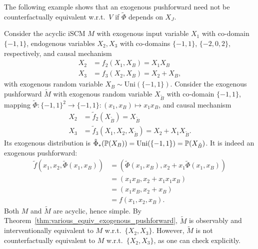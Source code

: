 The following example shows that an exogenous pushforward need not be counterfactually equivalent w.r.t.\ $V$ if $\tilde{\Phi}$ depends on $X_J$.
\begin{Eg}\label{eg:exogenous_pushforward_not_counterfactually_equivalent}
Consider the acyclic iSCM $M$ with exogenous input variable $X_1$ with co-domain $\{-1,1\}$, endogenous variables $X_2,X_3$ with co-domains $\{-1,1\}$, $\{-2,0,2\}$, respectively, and causal mechanism
  $$\begin{aligned} 
    X_2 &= f_2(X_1,X_B) = X_1 X_B \\
    X_3 &= f_3(X_2,X_B) = X_2 + X_B,
  \end{aligned}$$
with exogenous random variable $X_B \sim \mathrm{Uni}(\{-1,1\})$.
  Consider the exogenous pushforward $\tilde{M}$ with exogenous random variable $X_{\tilde{B}}$ with co-domain $\{-1,1\}$, mapping $\tilde{\Phi} : \{-1,1\}^2 \to \{-1,1\} : (x_1,x_B) \mapsto x_1 x_B$, and causal mechanism
  $$\begin{aligned} 
    X_2 &= \tilde{f}_2(X_{\tilde{B}}) = X_{\tilde{B}} \\
    X_3 &= \tilde{f}_3(X_1, X_2, X_{\tilde{B}}) = X_2 + X_1 X_{\tilde{B}}.
  \end{aligned}$$ 
  Its exogenous distribution is $\tilde{\Phi}_*(\mathbb{P}(X_B)) = \mathrm{Uni}(\{-1,1\}) = \mathbb{P}(X_{\tilde{B}})$.
It is indeed an exogenous pushforward:
  $$\begin{aligned}
    \tilde{f}(x_1,x_2,\tilde{\Phi}(x_1,x_B)) 
    &= (\tilde{\Phi}(x_1,x_B), x_2 + x_1 \tilde{\Phi}(x_1,x_B)) \\
    &= (x_1 x_B, x_2 + x_1 x_1 x_B) \\
    &= (x_1 x_B, x_2 + x_B) \\
    &= f(x_1,x_2,x_B).
  \end{aligned}$$
Both $M$ and $\tilde{M}$ are acyclic, hence simple.
By Theorem~\ref{thm:various_equiv_exogenous_pushforward}, $\tilde{M}$ is observably and interventionally equivalent to $M$ w.r.t.\ $\{X_2,X_3\}$.
However, $\tilde{M}$ is not counterfactually equivalent to $M$ w.r.t.\ $\{X_2,X_3\}$, as one can check explicitly.

\end{Eg}
